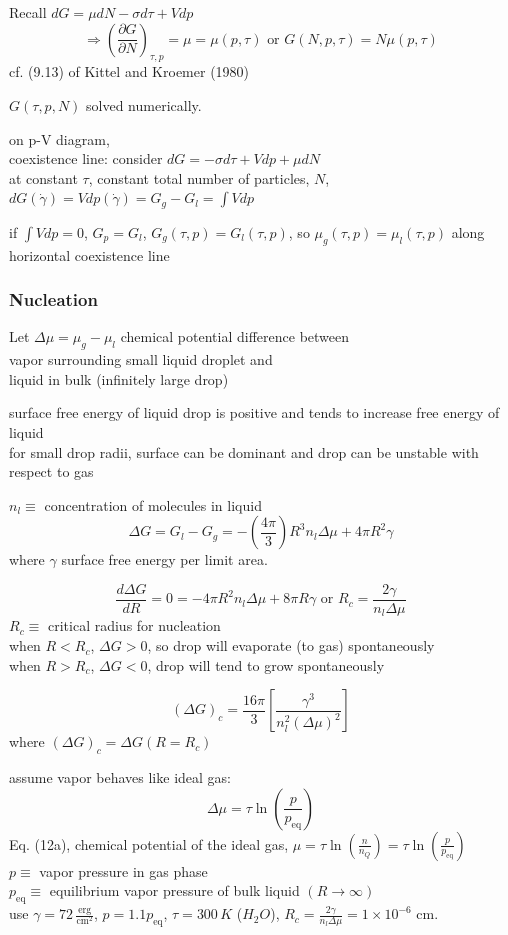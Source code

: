 Recall $dG = \mu dN - \sigma d\tau + Vdp$
\[
\Longrightarrow \left( \frac{ \partial G}{ \partial N} \right)_{\tau,p} = \mu = \mu(p,\tau) \text{ or } G(N,p,\tau) = N\mu(p,\tau)
\]
cf. (9.13) of Kittel and Kroemer (1980) \cite{CKittelHKroemer1980}

$G(\tau,p,N)$ solved numerically.

on p-V diagram, \\
\phantom{ \, } coexistence line: 
\phantom{ \, \quad } consider $dG = -\sigma d\tau + Vdp + \mu dN$ \\
\phantom{ \, \quad \, } at constant $\tau$, constant total number of particles, $N$, \\
$dG(\dot{\gamma}) = Vdp(\dot{\gamma}) = G_g - G_l = \int V dp$


if $\int V dp =0$, $G_p =G_l$, $G_g(\tau,p) = G_l(\tau,p)$, so $\mu_g(\tau,p) = \mu_l(\tau,p)$ along horizontal coexistence line

\subsubsection*{Nucleation}

Let $\Delta \mu = \mu_g - \mu_l$ chemical potential difference between \\
vapor surrounding small liquid droplet and \\
liquid in bulk (infinitely large drop) 

surface free energy of liquid drop is positive and tends to increase free energy of liquid \\
for small drop radii, surface can be dominant and drop can be unstable with respect to gas 

$n_l \equiv $ concentration of molecules in liquid 
\[
\Delta G = G_l -G_g = - \left( \frac{4\pi}{3} \right) R^3 n_l \Delta \mu + 4\pi R^2 \gamma 
\]
where $\gamma$ surface free energy per limit area.  

\[
\frac{d \Delta G}{dR} = 0 = -4\pi R^2 n_l \Delta \mu + 8 \pi R \gamma \text{ or } R_c = \frac{2\gamma }{ n_l \Delta \mu}
\]
$R_c \equiv $ critical radius for nucleation \\
when $R< R_c$, $\Delta G >0$, so drop will evaporate (to gas) spontaneously \\
when $R >R_c$, $\Delta G <0$, drop will tend to grow spontaneously

\[
(\Delta G)_c = \frac{16 \pi}{3} [ \frac{ \gamma^3}{ n_l^2 (\Delta \mu)^2 } ]
\]
where $(\Delta G)_c = \Delta G(R= R_c)$

assume vapor behaves like ideal gas: 
\[
\Delta \mu = \tau \ln{ \left( \frac{ p}{ p_{\text{eq}} } \right) }
\]
Eq. (12a), chemical potential of the ideal gas, $\mu = \tau \ln{ \left( \frac{n}{n_Q} \right)} = \tau \ln{ \left( \frac{p}{ p_{\text{eq}}} \right)}$ \\
\phantom{\quad \, } $p \equiv $ vapor pressure in gas phase \\ 
\phantom{\quad \, } $p_{\text{eq}} \equiv $ equilibrium vapor pressure of bulk liquid $(R \to \infty)$ \\
use $\gamma = 72 \, \frac{\text{erg}}{\text{cm}^2}$, $p =1.1 p_{\text{eq}}$, $\tau = 300 \, K$ ($H_2O$), $R_c = \frac{2\gamma}{n_l \Delta \mu } = 1\times 10^{-6}$ cm.  




